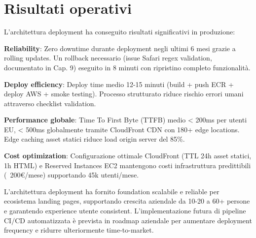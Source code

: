 \section{Risultati operativi}

L'architettura deployment ha conseguito risultati significativi in produzione:

\textbf{Reliability}: Zero downtime durante deployment negli ultimi 6 mesi grazie a rolling updates. Un rollback necessario (issue Safari regex validation, documentato in Cap. 9) eseguito in 8 minuti con ripristino completo funzionalità.

\textbf{Deploy efficiency}: Deploy time medio 12-15 minuti (build + push ECR + deploy AWS + smoke testing). Processo strutturato riduce rischio errori umani attraverso checklist validation.

\textbf{Performance globale}: Time To First Byte (TTFB) medio < 200ms per utenti EU, < 500ms globalmente tramite CloudFront CDN con 180+ edge locations. Edge caching asset statici riduce load origin server del 85\%.

\textbf{Cost optimization}: Configurazione ottimale CloudFront (TTL 24h asset statici, 1h HTML) e Reserved Instances EC2 mantengono costi infrastruttura predittibili (~200€/mese) supportando 45k utenti/mese.

\bigskip
L'architettura deployment ha fornito foundation scalabile e reliable per ecosistema landing pages, supportando crescita aziendale da 10-20 a 60+ persone e garantendo experience utente consistent. L'implementazione futura di pipeline CI/CD automatizzata è prevista in roadmap aziendale per aumentare deployment frequency e ridurre ulteriormente time-to-market.
